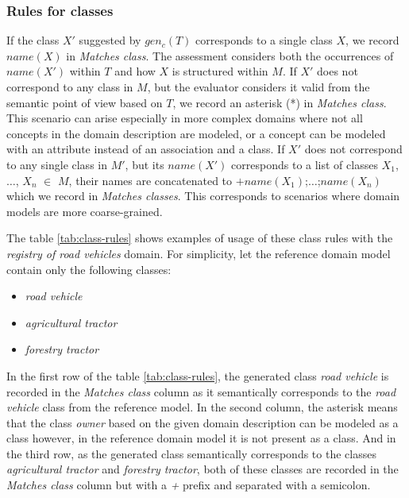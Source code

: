 \subsubsection{Rules for classes}
If the class $X'$ suggested by $gen_c(T)$ corresponds to a single class $X$, we record $name(X)$ in \emph{Matches class}.
The assessment considers both the occurrences of $name(X')$ within $T$ and how $X$ is structured within $M$.
If $X'$ does not correspond to any class in $M$, but the evaluator considers it valid from the semantic point of view based on $T$, we record an asterisk (*) in \emph{Matches class}.
This scenario can arise especially in more complex domains where not all concepts in the domain description are modeled, or a concept can be modeled with an attribute instead of an association and a class.
If $X'$ does not correspond to any single class in $M'$, but its $name(X')$ corresponds to a list of classes $X_1$, $\ldots$, $X_n$ $\in$ $M$, their names are concatenated to $+name(X_1)$;$\ldots$;$name(X_n)$ which we record in \emph{Matches classes}. This corresponds to scenarios where domain models are more coarse-grained.

The table \ref{tab:class-rules} shows examples of usage of these class rules with the \textit{registry of road vehicles} domain. For simplicity, let the reference domain model contain only the following classes:

\begin{itemize}
\item \textit{road vehicle}
\item \textit{agricultural tractor}
\item \textit{forestry tractor}
\end{itemize}

\noindent{}In the first row of the table \ref{tab:class-rules}, the generated class \textit{road vehicle} is recorded in the \textit{Matches class} column as it semantically corresponds to the \textit{road vehicle} class from the reference model. In the second column, the asterisk means that the class \textit{owner} based on the given domain description can be modeled as a class however, in the reference domain model it is not present as a class. And in the third row, as the generated class semantically corresponds to the classes \textit{agricultural tractor} and \textit{forestry tractor}, both of these classes are recorded in the \textit{Matches class} column but with a \textit{+} prefix and separated with a semicolon.

